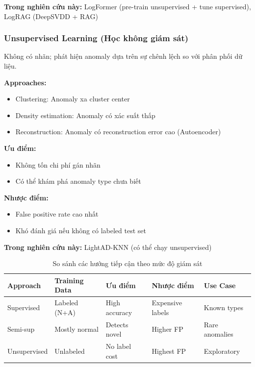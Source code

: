 \textbf{Trong nghiên cứu này:} LogFormer (pre-train unsupervised + tune supervised), LogRAG (DeepSVDD + RAG)

\subsubsection{Unsupervised Learning (Học không giám sát)}

Không có nhãn; phát hiện anomaly dựa trên sự chênh lệch so với phân phối dữ liệu.

\textbf{Approaches:}
\begin{itemize}
    \item Clustering: Anomaly xa cluster center
    \item Density estimation: Anomaly có xác suất thấp
    \item Reconstruction: Anomaly có reconstruction error cao (Autoencoder)
\end{itemize}

\textbf{Ưu điểm:}
\begin{itemize}
    \item Không tốn chi phí gán nhãn
    \item Có thể khám phá anomaly type chưa biết
\end{itemize}

\textbf{Nhược điểm:}
\begin{itemize}
    \item False positive rate cao nhất
    \item Khó đánh giá nếu không có labeled test set
\end{itemize}

\textbf{Trong nghiên cứu này:} LightAD-KNN (có thể chạy unsupervised)

\begin{table}[ht]
\centering
\caption{So sánh các hướng tiếp cận theo mức độ giám sát}
\label{tab:supervision-comparison}
\begin{tabular}{lllll}
\hline
\textbf{Approach} & \textbf{Training Data} & \textbf{Ưu điểm} & \textbf{Nhược điểm} & \textbf{Use Case} \\
\hline
Supervised & Labeled (N+A) & High accuracy & Expensive labels & Known types \\
Semi-sup & Mostly normal & Detects novel & Higher FP & Rare anomalies \\
Unsupervised & Unlabeled & No label cost & Highest FP & Exploratory \\
\hline
\end{tabular}
\end{table}

